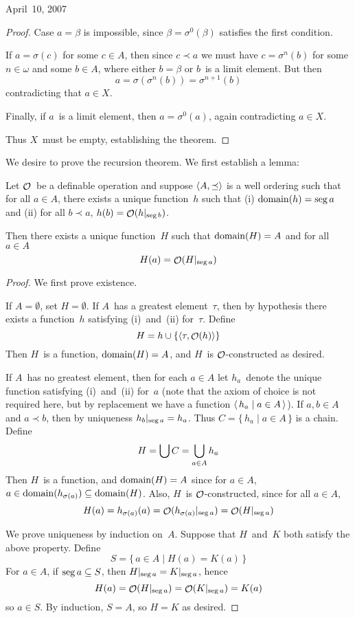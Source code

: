 \begin{lecture}{April~10, 2007}
\begin{proof}
Case \(a=\beta\) is impossible, since \(\beta=\sigma^0(\beta)\) satisfies the first condition. 

If \(a=\sigma(c)\) for some \(c\in A\), then since \(c\prec a\) we must have \(c=\sigma^n(b)\) for some \(n\in\omega\) and some \(b\in A\), where either \(b=\beta\) or \(b\)~is a limit element. But then
\[a=\sigma(\sigma^n(b))=\sigma^{n+1}(b)\]
contradicting that \(a\in X\).

Finally, if \(a\)~is a limit element, then \(a=\sigma^0(a)\), again contradicting \(a\in X\).

Thus \(X\)~must be empty, establishing the theorem.
\end{proof}

We desire to prove the recursion theorem. We first establish a lemma:
\begin{lem}
Let \(\mathop{\mathcal{O}}\nolimits\)~be a definable operation and suppose \(\langle{A},{\preceq}\rangle\) is a well ordering such that for all \(a\in A\), there exists a unique function~\(h\) such that (i) \(\operatorname{domain}(h)=\operatorname{seg} a\) and (ii) for all \(b\prec a\), \(h(b)=\mathop{\mathcal{O}}\nolimits(h|_{\operatorname{seg} b})\).

Then there exists a unique function~\(H\) such that \(\operatorname{domain}(H)=A\) and for all \(a\in A\)
\[H(a)=\mathop{\mathcal{O}}\nolimits(H|_{\operatorname{seg} a})\]
\end{lem}
\begin{proof}
We first prove existence.

If \(A=\emptyset\), set \(H=\emptyset\). If \(A\)~has a greatest element~\(\tau\), then by hypothesis there exists a function~\(h\) satisfying (i)~and~(ii) for~\(\tau\). Define
\[H=h\cup\{\langle{\tau},{\mathop{\mathcal{O}}\nolimits(h)}\rangle\}\]
Then \(H\)~is a function, \(\operatorname{domain}(H)=A\), and \(H\)~is \(\mathop{\mathcal{O}}\nolimits\)-constructed as desired.

If \(A\)~has no greatest element, then for each \(a\in A\) let \(h_a\)~denote the unique function satisfying (i)~and~(ii) for~\(a\) (note that the axiom of choice is not required here, but by replacement we have a function \(\langle\,{h_a}\mid{a\in A}\,\rangle\)). If \(a,b\in A\) and \(a\prec b\), then by uniqueness \(h_b|_{\operatorname{seg} a}=h_a\). Thus \(C=\{\,h_a\mid a\in A\,\}\) is a chain. Define
\[H=\bigcup C=\bigcup_{a\in A}h_a\]
Then \(H\)~is a function, and \(\operatorname{domain}(H)=A\) since for \(a\in A\), \(a\in\operatorname{domain}(h_{\sigma(a)})\subseteq\operatorname{domain}(H)\). Also, \(H\)~is \(\mathop{\mathcal{O}}\nolimits\)-constructed, since for all \(a\in A\),
\[H(a)=h_{\sigma(a)}(a)=\mathop{\mathcal{O}}\nolimits(h_{\sigma(a)}|_{\operatorname{seg} a})=\mathop{\mathcal{O}}\nolimits(H|_{\operatorname{seg} a})\]

We prove uniqueness by induction on~\(A\). Suppose that \(H\)~and~\(K\) both satisfy the above property. Define
\[S=\{\,a\in A\mid H(a)=K(a)\,\}\]
For \(a\in A\), if \(\operatorname{seg} a\subseteq S\), then \(H|_{\operatorname{seg} a}=K|_{\operatorname{seg} a}\), hence
\[H(a)=\mathop{\mathcal{O}}\nolimits(H|_{\operatorname{seg} a})=\mathop{\mathcal{O}}\nolimits(K|_{\operatorname{seg} a})=K(a)\]
so \(a\in S\). By induction, \(S=A\), so \(H=K\) as desired.
\end{proof}


\end{lecture}

